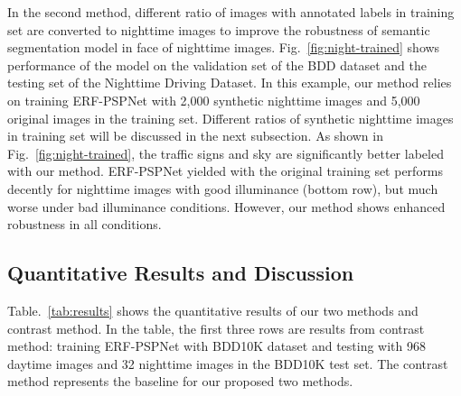 \documentclass[a4paper]{spie}
\begin{document}
In the second method, different ratio of images with annotated labels in training set are converted to nighttime images to improve the robustness of semantic segmentation model in face of nighttime images. Fig.~\ref{fig:night-trained} shows performance of the model on the validation set of the BDD dataset and the testing set of the Nighttime Driving Dataset. In this example, our method relies on training ERF-PSPNet with 2,000 synthetic nighttime images and 5,000 original images in the training set. Different ratios of synthetic nighttime images in training set will be discussed in the next subsection. As shown in Fig.~\ref{fig:night-trained}, the traffic signs and sky are significantly better labeled with our method. ERF-PSPNet yielded with the original training set performs decently for nighttime images with good illuminance (bottom row), but much worse under bad illuminance conditions. However, our method shows enhanced robustness in all conditions.

\subsection{Quantitative Results and Discussion}

Table.~\ref{tab:results} shows the quantitative results of our two methods and contrast method. In the table, the first three rows are results from contrast method: training ERF-PSPNet with BDD10K dataset and testing with 968 daytime images and 32 nighttime images in the BDD10K test set. The contrast method represents the baseline for our proposed two methods.
\end{document}
